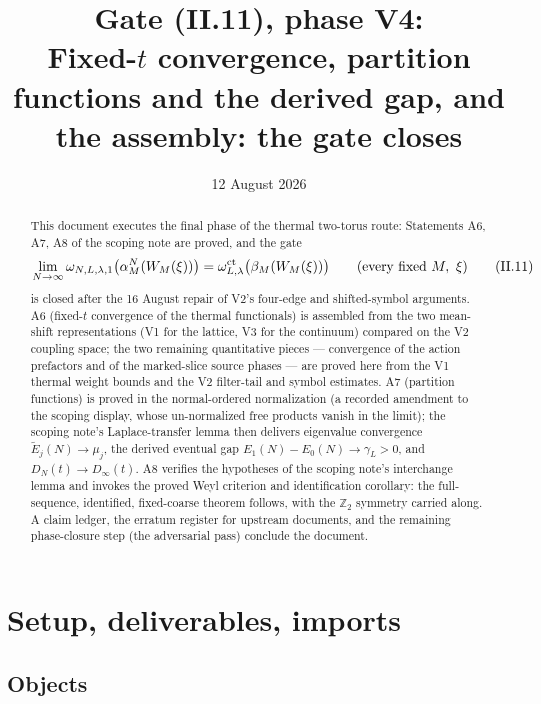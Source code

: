 \documentclass[11pt,a4paper]{article}
\title{Gate (II.11), phase V4:\\[4pt]
\large Fixed-$t$ convergence, partition functions and the derived gap,
and the assembly: the gate closes}
\author{}
\date{12 August 2026}
\theoremstyle{plain}
\theoremstyle{definition}
\newcommand{\Z}{\mathbb{Z}}
\begin{document}
\maketitle

\begin{abstract}
This document executes the final phase of the thermal two-torus route:
Statements A6, A7, A8 of the scoping note are proved, and the gate
\[
 \lim_{N\to\infty}\omega_{N,L,\lambda,1}\bigl(\alpha_M^N(W_M(\xi))\bigr)
 =\omega^{\rm ct}_{L,\lambda}\bigl(\beta_M(W_M(\xi))\bigr)
 \qquad(\text{every fixed }M,\ \xi)
 \tag{II.11}
\]
is closed after the 16 August repair of V2's four-edge and shifted-symbol
arguments. A6 (fixed-$t$ convergence of the thermal functionals) is
assembled from the two mean-shift representations (V1 for the lattice, V3
for the continuum) compared on the V2 coupling space; the two remaining
quantitative pieces --- convergence of the action prefactors and of the
marked-slice source phases --- are proved here from the V1 thermal weight
bounds and the V2 filter-tail and symbol estimates. A7 (partition
functions) is proved in the normal-ordered normalization (a recorded
amendment to the scoping display, whose un-normalized free products vanish
in the limit); the scoping note's Laplace-transfer lemma then delivers
eigenvalue convergence $\widetilde E_j(N)\to\mu_j$, the derived eventual
gap $E_1(N)-E_0(N)\to\gamma_L>0$, and $D_N(t)\to D_\infty(t)$. A8 verifies
the hypotheses of the scoping note's interchange lemma and invokes the
proved Weyl criterion and identification corollary: the full-sequence,
identified, fixed-coarse theorem follows, with the $\Z_2$ symmetry carried
along. A claim ledger, the erratum register for upstream documents, and
the remaining phase-closure step (the adversarial pass) conclude the
document.
\end{abstract}

\tableofcontents

\section{Setup, deliverables, imports}\label{sec:setup}

\subsection{Objects}
\end{document}
